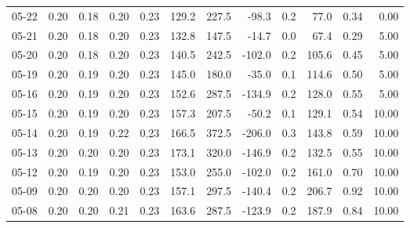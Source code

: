 \begin{threeparttable}
{\begin{tabular}{lrrrrrrrrrrr}
  05-22 &          0.20 &          0.18 &          0.20 &        0.23 &               129.2 &               227.5 &      -98.3 &                 0.2 &             77.0 &            0.34 &                   0.00 \\
  05-21 &          0.20 &          0.18 &          0.20 &        0.23 &               132.8 &               147.5 &      -14.7 &                 0.0 &             67.4 &            0.29 &                   5.00 \\
  05-20 &          0.20 &          0.18 &          0.20 &        0.23 &               140.5 &               242.5 &     -102.0 &                 0.2 &            105.6 &            0.45 &                   5.00 \\
  05-19 &          0.20 &          0.19 &          0.20 &        0.23 &               145.0 &               180.0 &      -35.0 &                 0.1 &            114.6 &            0.50 &                   5.00 \\
  05-16 &          0.20 &          0.19 &          0.20 &        0.23 &               152.6 &               287.5 &     -134.9 &                 0.2 &            128.0 &            0.55 &                   5.00 \\
  05-15 &          0.20 &          0.19 &          0.20 &        0.23 &               157.3 &               207.5 &      -50.2 &                 0.1 &            129.1 &            0.54 &                  10.00 \\
  05-14 &          0.20 &          0.19 &          0.22 &        0.23 &               166.5 &               372.5 &     -206.0 &                 0.3 &            143.8 &            0.59 &                  10.00 \\
  05-13 &          0.20 &          0.20 &          0.20 &        0.23 &               173.1 &               320.0 &     -146.9 &                 0.2 &            132.5 &            0.55 &                  10.00 \\
  05-12 &          0.20 &          0.19 &          0.20 &        0.23 &               153.0 &               255.0 &     -102.0 &                 0.2 &            161.0 &            0.70 &                  10.00 \\
  05-09 &          0.20 &          0.20 &          0.20 &        0.23 &               157.1 &               297.5 &     -140.4 &                 0.2 &            206.7 &            0.92 &                  10.00 \\
  05-08 &          0.20 &          0.20 &          0.21 &        0.23 &               163.6 &               287.5 &     -123.9 &                 0.2 &            187.9 &            0.84 &                  10.00 \\

\end{tabular}}
\end{threeparttable}
